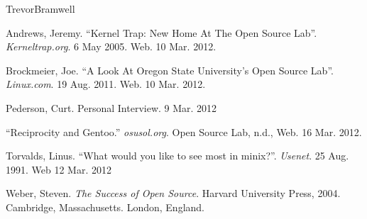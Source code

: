 \documentclass[12pt,letterpaper]{article}
\begin{document}
\begin{mla}{Trevor}{Bramwell}
\begin{workscited}
\bibent
Andrews, Jeremy. ``Kernel Trap: New Home At The Open Source Lab''.
    \emph{Kerneltrap.org}. 6 May 2005. Web. 10 Mar. 2012.

\bibent
Brockmeier, Joe. ``A Look At Oregon State University's Open Source Lab''.
    \emph{Linux.com}. 19 Aug. 2011. Web. 10 Mar. 2012.

\bibent
Pederson, Curt. Personal Interview. 9 Mar. 2012

\bibent
``Reciprocity and Gentoo.'' \emph{osusol.org}. Open Source Lab, n.d., Web.
    16 Mar. 2012.

\bibent
Torvalds, Linus. ``What would you like to see most in minix?''. \emph{Usenet}.
    25 Aug. 1991. Web 12 Mar. 2012

\bibent
Weber, Steven. \emph{The Success of Open Source}. Harvard University Press, 
    2004. 
Cambridge, Massachusetts.
London, England.
\end{workscited}

\end{mla}
\end{document}
